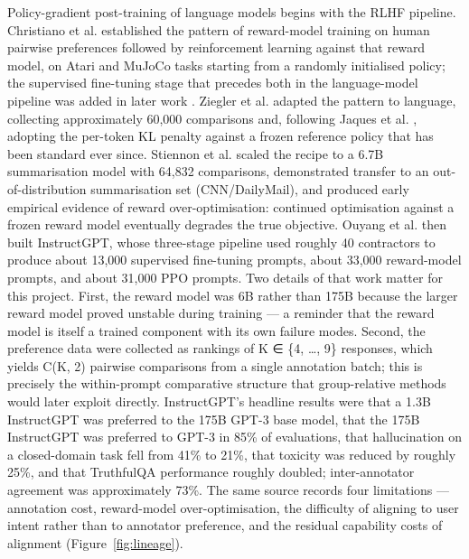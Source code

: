 \documentclass[12pt,a4paper]{report}
\begin{document}
Policy-gradient post-training of language models begins with the RLHF
pipeline. Christiano et al. \citep{christiano2017deeprlhf} established
the pattern of reward-model training on human pairwise preferences
followed by reinforcement learning against that reward model, on Atari
and MuJoCo tasks starting from a randomly initialised policy; the
supervised fine-tuning stage that precedes both in the language-model
pipeline was added in later work
\citep{stiennon2020summarize, ouyang2022instructgpt}. Ziegler et al.
\citep{ziegler2019finetuning} adapted the pattern to language,
collecting approximately 60,000 comparisons and, following Jaques et al.
\citep{jaques2017sequencetutor, jaques2019wayoffpolicy}, adopting the
per-token KL penalty against a frozen reference policy that has been
standard ever since. Stiennon et al. \citep{stiennon2020summarize}
scaled the recipe to a 6.7B summarisation model with 64,832 comparisons,
demonstrated transfer to an out-of-distribution summarisation set
(CNN/DailyMail), and produced early empirical evidence of reward
over-optimisation: continued optimisation against a frozen reward model
eventually degrades the true objective. Ouyang et al.
\citep{ouyang2022instructgpt} then built InstructGPT, whose three-stage
pipeline used roughly 40 contractors to produce about 13,000 supervised
fine-tuning prompts, about 33,000 reward-model prompts, and about 31,000
PPO prompts. Two details of that work matter for this project. First,
the reward model was 6B rather than 175B because the larger reward model
proved unstable during training --- a reminder that the reward model is
itself a trained component with its own failure modes. Second, the
preference data were collected as rankings of K ∈ \{4, \ldots, 9\}
responses, which yields C(K, 2) pairwise comparisons from a single
annotation batch; this is precisely the within-prompt comparative
structure that group-relative methods would later exploit directly.
InstructGPT's headline results were that a 1.3B InstructGPT was
preferred to the 175B GPT-3 base model, that the 175B InstructGPT was
preferred to GPT-3 in 85\% of evaluations, that hallucination on a
closed-domain task fell from 41\% to 21\%, that toxicity was reduced by
roughly 25\%, and that TruthfulQA performance roughly doubled;
inter-annotator agreement was approximately 73\%. The same source
records four limitations --- annotation cost, reward-model
over-optimisation, the difficulty of aligning to user intent rather than
to annotator preference, and the residual capability costs of alignment (Figure~\ref{fig:lineage}).
\end{document}
